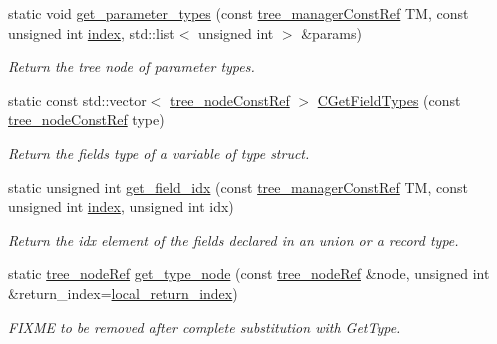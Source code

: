 \begin{DoxyCompactItemize}
static void \hyperlink{classtree__helper_ab377de808719926b9d9097bbbf3a329a}{get\+\_\+parameter\+\_\+types} (const \hyperlink{tree__manager_8hpp_a792e3f1f892d7d997a8d8a4a12e39346}{tree\+\_\+manager\+Const\+Ref} TM, const unsigned int \hyperlink{tutorial__pact__2019_2Introduction_2third_2include_2Keccak_8h_a028c9bdc8344cca38ab522a337074797}{index}, std\+::list$<$ unsigned int $>$ \&params)
\begin{DoxyCompactList}\small\item\em Return the tree node of parameter types. \end{DoxyCompactList}\item 
static const std\+::vector$<$ \hyperlink{tree__node_8hpp_a3cf5d02292c940f3892425a5b5fdec3c}{tree\+\_\+node\+Const\+Ref} $>$ \hyperlink{classtree__helper_a0609784685642ee8a73ecbb32d5c3562}{C\+Get\+Field\+Types} (const \hyperlink{tree__node_8hpp_a3cf5d02292c940f3892425a5b5fdec3c}{tree\+\_\+node\+Const\+Ref} type)
\begin{DoxyCompactList}\small\item\em Return the fields type of a variable of type struct. \end{DoxyCompactList}\item 
static unsigned int \hyperlink{classtree__helper_a421a616c7a58cf4de41549f3e0a3efcb}{get\+\_\+field\+\_\+idx} (const \hyperlink{tree__manager_8hpp_a792e3f1f892d7d997a8d8a4a12e39346}{tree\+\_\+manager\+Const\+Ref} TM, const unsigned int \hyperlink{tutorial__pact__2019_2Introduction_2third_2include_2Keccak_8h_a028c9bdc8344cca38ab522a337074797}{index}, unsigned int idx)
\begin{DoxyCompactList}\small\item\em Return the idx element of the fields declared in an union or a record type. \end{DoxyCompactList}\item 
static \hyperlink{tree__node_8hpp_a6ee377554d1c4871ad66a337eaa67fd5}{tree\+\_\+node\+Ref} \hyperlink{classtree__helper_a687cfb8bc559db48750e1ecbc1019bae}{get\+\_\+type\+\_\+node} (const \hyperlink{tree__node_8hpp_a6ee377554d1c4871ad66a337eaa67fd5}{tree\+\_\+node\+Ref} \&node, unsigned int \&return\+\_\+index=\hyperlink{classtree__helper_a8b5eaad0abef101ef9c92076671efa62}{local\+\_\+return\+\_\+index})
\begin{DoxyCompactList}\small\item\em F\+I\+X\+ME to be removed after complete substitution with Get\+Type. \end{DoxyCompactList}\item 

\end{DoxyCompactItemize}
